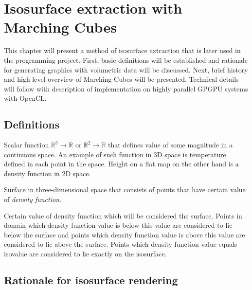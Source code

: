 \chapter{Isosurface extraction with Marching Cubes}

This chapter will present a method of isosurface extraction that is later used
in the programming project. First, basic definitions will be established and
rationale for generating graphics with volumetric data will be discussed.
Next, brief history and high level overview of Marching Cubes will be presented.
Technical details will follow with description of implementation on highly
parallel GPGPU systems with OpenCL.

\section{Definitions}

\begin{defn}
\label{def:density function}
Scalar function
$\mathbb{R}^3\rightarrow\mathbb{R}$ or $\mathbb{R}^2\rightarrow\mathbb{R}$
that defines value of some magnitude in a continuous space. An example of such
function in 3D space is temperature defined in each point in the space. Height
on a flat map on the other hand is a density function in 2D space.
\end{defn}

\begin{defn}[Isosurface]
Surface in three-dimensional space that consists of points that have certain
value of \emph{density function}.
\end{defn}

\begin{defn}[Isovalue]
Certain value of density function which will be considered the surface. Points
in domain which density function value is below this value are considered to
lie below the surface and points which density function value is above this
value are considered to lie above the surface. Points which density function
value equals isovalue are considered to lie exactly on the isosurface.
\end{defn}

\section{Rationale for isosurface rendering}

